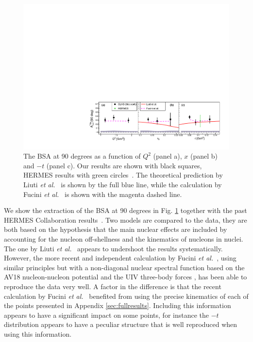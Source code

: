 \documentclass[aps,prc,preprint,superscriptaddress]{revtex4}
\begin{document}
\begin{figure}[tbp]
\center
\includegraphics[width=16cm]{Coherent_ALU_phi_90.pdf}
\caption{The BSA at 90 degrees as a function of $Q^2$ (panel a), $x$ (panel b) and $-t$ (panel c).
	Our results are shown with black squares, HERMES results 
	with green circles~\cite{Airapetian:2009cga}. The theoretical prediction 
	by Liuti \textit{et al.}~\cite{Liuti:2005gi,GonzalezHernandez:2012jv} is shown 
	by the full blue line, while the calculation by Fucini 
	\textit{et al.}~\cite{Fucini:2018gso} is shown with the magenta dashed line.}
\label{fig:CohALU90}
\end{figure}

We show the extraction of the BSA at 90 degrees in Fig. \ref{fig:CohALU90} together with the 
past HERMES Collaboration results~\cite{Airapetian:2009cga}. Two models are compared to the 
data, they are both based on the hypothesis that the main nuclear effects are 
included by accounting for the nucleon off-shellness and the kinematics of nucleons in nuclei. The 
one by Liuti \textit{et al.}~\cite{Liuti:2005gi,GonzalezHernandez:2012jv} 
appears to undershoot the results systematically. However, the more recent and independent 
calculation by Fucini \textit{et al.}~\cite{Fucini:2018gso}, using similar principles but with a non-diagonal nuclear spectral 
function \cite{Viviani:2001wu} based on the AV18 nucleon-nucleon potential \cite{Wiringa:1994wb} 
and the UIV three-body forces \cite{Pudliner:1995wk}, has been able to reproduce the data very 
well. A factor in the difference is that the recent calculation by Fucini {\it et 
al.}~\cite{Fucini:2018gso} benefited from using the precise kinematics of each of the points presented 
in Appendix \ref{sec:fullresults}. Including this information appears to have a significant 
impact on some points, for instance the $-t$ distribution appears to have a peculiar structure 
that is well reproduced when using this information. 
\end{document}
